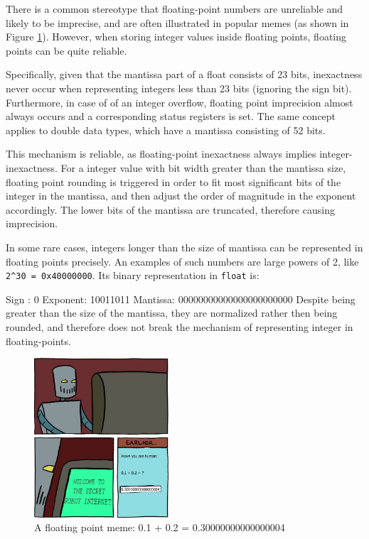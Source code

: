 \documentclass[logo,bsc,singlespacing,parskip]{infthesis}
\newenvironment{VerbatimCompact}
  {\vspace*{-2.5mm}\VerbatimEnvironment
   \par\Verbatim}
  {\endVerbatim\vspace*{-2.4mm}}
\begin{document}
There is a common stereotype that floating-point numbers are unreliable and
likely to be imprecise, and are often illustrated in popular memes (as shown in
Figure \ref{meme}). However, when storing integer values inside floating points, 
floating points can be quite reliable. 

Specifically, given that the mantissa part of a float consists of 23 bits,
inexactness never occur when representing integers less than 23 bits (ignoring
the sign bit). Furthermore, in case of of an integer overflow, floating point
imprecision almost always occurs and a corresponding status registers is set.
The same concept applies to double data types, which have a mantissa consisting
of 52 bits.

This mechanism is reliable, as floating-point inexactness always implies
integer-inexactness. For a integer value with bit width greater than the
mantissa size, floating point rounding is triggered in order to fit most
significant bits of the integer in the mantissa, and then adjust the order of
magnitude in the exponent accordingly. The lower bits of the mantissa are
truncated, therefore causing imprecision. 

In some rare cases, integers longer than the size of mantissa can be represented
in floating points precisely. An examples of such numbers are large powers of 2,
like \texttt{2\^{}30 = 0x40000000}. Its binary representation in \texttt{float}
is:
\begin{VerbatimCompact}
Sign    : 0
Exponent: 10011011
Mantissa: 00000000000000000000000
\end{VerbatimCompact}
Despite being greater than the size of
the mantissa, they are normalized rather then being rounded, and therefore does
not break the mechanism of representing integer in floating-points.

\begin{figure}
\begin{center}
    \includegraphics[width=50mm,scale=0.1]{image/0.3004.jpg}
    \caption{A floating point meme: 0.1 + 0.2 = 0.30000000000000004}
    \label{meme}
\end{center}
\end{figure}
\end{document}
